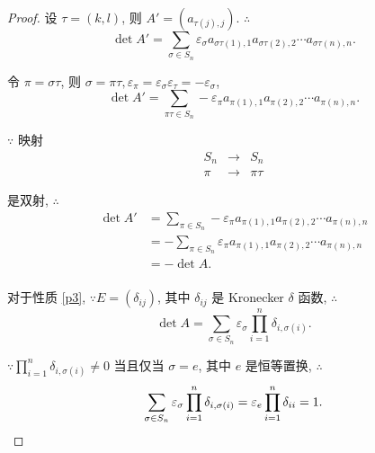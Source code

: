 \documentclass{ctexart}
\begin{document}
\begin{proof}
    设 $\tau=(k,l)$, 则 $A'=(a_{\tau(j),j})$. $\therefore$
    \[\det A'=\sum\limits_{\sigma\in S_n}\varepsilon_\sigma a_{\sigma\tau(1),1}a_{\sigma\tau(2),2}\cdots a_{\sigma\tau(n),n}.\]

    令 $\pi=\sigma\tau$, 则 $\sigma=\pi\tau,\varepsilon_\pi=\varepsilon_\sigma\varepsilon_\tau=-\varepsilon_\sigma$,
    \[\det A'=\sum\limits_{\pi\tau\in S_n}-\varepsilon_\pi a_{\pi(1),1}a_{\pi(2),2}\cdots a_{\pi(n),n}.\]

    $\because$ 映射
    \[\begin{array}{rcl}
        S_n & \to & S_n \\
        \pi & \to & \pi\tau
    \end{array}\]

    是双射, $\therefore$
    \begin{align*}
        \det A' & =\sum\limits_{\pi\in S_n}-\varepsilon_\pi a_{\pi(1),1}a_{\pi(2),2}\cdots a_{\pi(n),n} \\
        & =-\sum\limits_{\pi\in S_n}\varepsilon_\pi a_{\pi(1),1}a_{\pi(2),2}\cdots a_{\pi(n),n} \\
        & =-\det A. \\
    \end{align*}

    对于性质 \ref{p3}, $\because E=(\delta_{ij})$, 其中 $\delta_{ij}$ 是 Kronecker $\delta$ 函数, $\therefore$
    \[\det A=\sum\limits_{\sigma\in S_n}\varepsilon_\sigma\prod\limits_{i=1}^n\delta_{i,\sigma(i)}.\]

    $\because\prod\limits_{i=1}^n\delta_{i,\sigma(i)}\neq0$ 当且仅当 $\sigma=e$, 其中 $e$ 是恒等置换, $\therefore$
    \[\sum\limits_{\sigma\in S_n}\varepsilon_\sigma\prod\limits_{i=1}^n\delta_{i,\sigma(i)}=\varepsilon_e\prod\limits_{i=1}^n\delta_{ii}=1.\qedhere\]
\end{proof}
\end{document}
